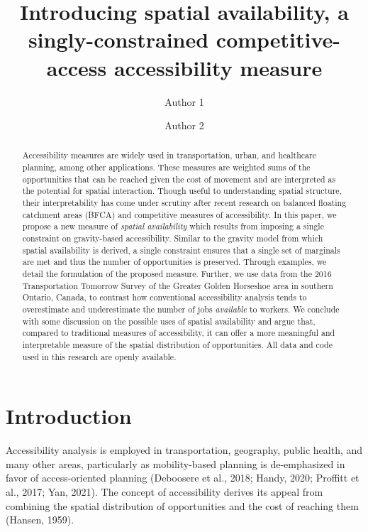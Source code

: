 \documentclass[]{elsarticle} %
\begin{document}
\begin{frontmatter}

  \title{Introducing spatial availability, a singly-constrained
competitive-access accessibility measure}
    \author[School]{Author 1}
    \author[School]{Author 2}
      \address[School]{Some School}
  
  \begin{abstract}
  Accessibility measures are widely used in transportation, urban, and
  healthcare planning, among other applications. These measures are
  weighted sums of the opportunities that can be reached given the cost
  of movement and are interpreted as the potential for spatial
  interaction. Though useful to understanding spatial structure, their
  interpretability has come under scrutiny after recent research on
  balanced floating catchment areas (BFCA) and competitive measures of
  accessibility. In this paper, we propose a new measure of
  \emph{spatial availability} which results from imposing a single
  constraint on gravity-based accessibility. Similar to the gravity
  model from which spatial availability is derived, a single constraint
  ensures that a single set of marginals are met and thus the number of
  opportunities is preserved. Through examples, we detail the
  formulation of the proposed measure. Further, we use data from the
  2016 Transportation Tomorrow Survey of the Greater Golden Horseshoe
  area in southern Ontario, Canada, to contrast how conventional
  accessibility analysis tends to overestimate and underestimate the
  number of jobs \emph{available} to workers. We conclude with some
  discussion on the possible uses of spatial availability and argue
  that, compared to traditional measures of accessibility, it can offer
  a more meaningful and interpretable measure of the spatial
  distribution of opportunities. All data and code used in this research
  are openly available.
  \end{abstract}
  
 \end{frontmatter}

\newpage

\hypertarget{introduction}{%
\section{Introduction}\label{introduction}}

Accessibility analysis is employed in transportation, geography, public
health, and many other areas, particularly as mobility-based planning is
de-emphasized in favor of access-oriented planning (Deboosere et al.,
2018; Handy, 2020; Proffitt et al., 2017; Yan, 2021). The concept of
accessibility derives its appeal from combining the spatial distribution
of opportunities and the cost of reaching them (Hansen, 1959).
\end{document}
